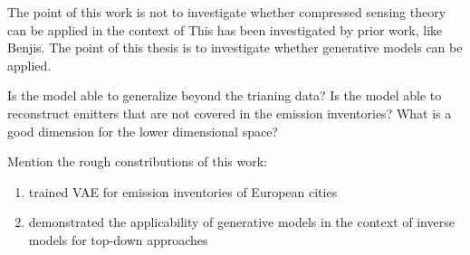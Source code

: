 The point of this work is not to investigate whether compressed sensing theory can be applied in the context of 
This has been investigated by prior work, like Benjis.
The point of this thesis is to investigate whether generative models can be applied.

Is the model able to generalize beyond the trianing data?
Is the model able to reconstruct emitters that are not covered in the emission inventories? 
What is a good dimension for the lower dimensional space?

Mention the rough constributions of this work:
\begin{enumerate}
    \item trained VAE for emission inventories of European cities
    \item demonstrated the applicability of generative models in the context of inverse models for top-down approaches
\end{enumerate}
